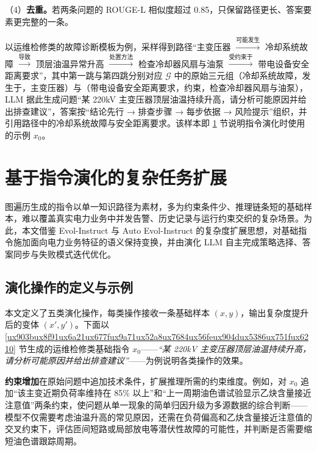 \documentclass[fontset=fandol,type=master,campus=shenzhen,etitleauto=true]{hithesisbook}
\begin{document}
（4）\textbf{去重。}若两条问题的 ROUGE-L 相似度\cite{ref75}超过 0.85，只保留路径更长、答案要素更完整的一条。

以运维检修类的故障诊断模板为例，采样得到路径“主变压器 $\xrightarrow{\text{可能发生}}$ 冷却系统故障 $\xrightarrow{\text{导致}}$ 顶层油温异常升高 $\xrightarrow{\text{处置方法}}$ 检查冷却器风扇与油泵 $\xrightarrow{\text{受约束于}}$ 带电设备安全距离要求”，其中第一跳与第四跳分别对应 $\mathcal{G}$ 中的原始三元组（冷却系统故障，发生于，主变压器）与（带电设备安全距离要求，约束，检查冷却器风扇与油泵），LLM 据此生成问题“某 220kV 主变压器顶层油温持续升高，请分析可能原因并给出排查建议”，答案按“结论先行 → 排查步骤 → 每步依据 → 风险提示”组织，并引用路径中的冷却系统故障与安全距离要求。该样本即 \ref{ux57faux4e8eux6307ux4ee4ux6f14ux5316ux7684ux590dux6742ux4efbux52a1ux6269ux5c55} 节说明指令演化时使用的示例 $x_0$。

\section{基于指令演化的复杂任务扩展}\label{ux57faux4e8eux6307ux4ee4ux6f14ux5316ux7684ux590dux6742ux4efbux52a1ux6269ux5c55}

图遍历生成的指令以单一知识路径为素材，多为约束条件少、推理链条短的基础样本，难以覆盖真实电力业务中并发告警、历史记录与运行约束交织的复杂场景。为此，本文借鉴 Evol-Instruct\cite{ref25} 与 Auto Evol-Instruct\cite{ref53} 的复杂度扩展思想，对基础指令施加面向电力业务特征的语义保持变换，并由演化 LLM 自主完成策略选择、答案同步与失败模式迭代优化。

\subsection{演化操作的定义与示例}\label{ux9762ux5411ux4e03ux7c7bux6570ux636eux7c7bux578bux7684ux5deeux5f02ux5316ux6307ux4ee4ux6f14ux5316}

本文定义了五类演化操作，每类操作接收一条基础样本 $(x, y)$，输出复杂度提升后的变体 $(x', y')$。下面以 \ref{ux903bux8f91ux6a21ux677fux9a71ux52a8ux7684ux56feux904dux5386ux751fux6210} 节生成的运维检修类基础指令 $x_0$——\emph{“某 220kV 主变压器顶层油温持续升高，请分析可能原因并给出排查建议”}——为例说明各类操作的效果。

\textbf{约束增加}在原始问题中追加技术条件，扩展推理所需的约束维度。例如，对 $x_0$ 追加``该主变近期负荷率维持在 85\% 以上''和``上一周期油色谱试验显示乙炔含量接近注意值''两条约束，使问题从单一现象的简单归因升级为多源数据的综合判断------模型不仅需要考虑油温升高的常见原因，还需在负荷偏高和乙炔含量接近注意值的交叉约束下，评估匝间短路或局部放电等潜伏性故障的可能性，并判断是否需要缩短油色谱跟踪周期。
\end{document}

